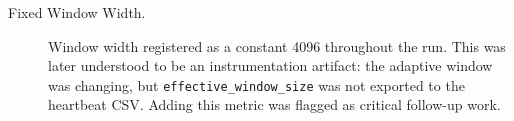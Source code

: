 \begin{description}
  \item[Fixed Window Width.]
        Window width registered as a constant 4096 throughout the run.
        This was later understood to be an instrumentation artifact:
        the adaptive window was changing, but \texttt{effective\_window\_size}
        was not exported to the heartbeat CSV. Adding this metric was
        flagged as critical follow-up work.
\end{description}
